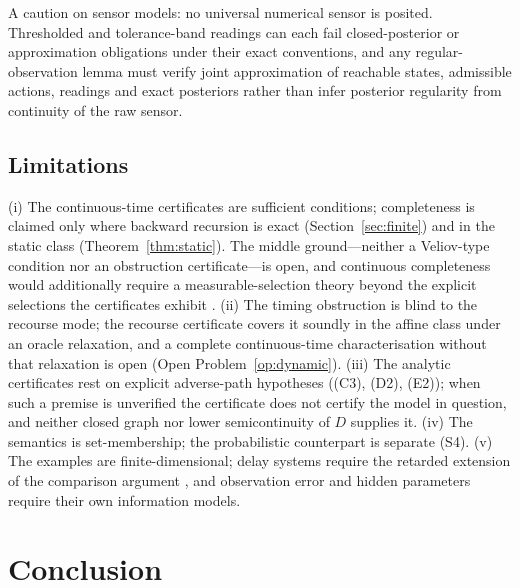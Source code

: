 \documentclass[11pt,a4paper]{article}
\theoremstyle{plain}
\theoremstyle{definition}
\theoremstyle{remark}
\newcommand{\hyp}[1]{\textup{(#1)}}
\begin{document}
A caution on sensor models: no universal numerical sensor is posited. Thresholded and tolerance-band readings can each fail closed-posterior or approximation obligations under their exact conventions, and any regular-observation lemma must verify joint approximation of reachable states, admissible actions, readings and exact posteriors rather than infer posterior regularity from continuity of the raw sensor.

\subsection{Limitations}\label{sec:limitations}

(i) The continuous-time certificates are sufficient conditions; completeness is claimed only where backward recursion is exact (Section~\ref{sec:finite}) and in the static class (Theorem~\ref{thm:static}). The middle ground---neither a Veliov-type condition nor an obstruction certificate---is open, and continuous completeness would additionally require a measurable-selection theory beyond the explicit selections the certificates exhibit \citep{bertsekas1978}. (ii) The timing obstruction is blind to the recourse mode; the recourse certificate covers it soundly in the affine class under an oracle relaxation, and a complete continuous-time characterisation without that relaxation is open (Open Problem~\ref{op:dynamic}). (iii) The analytic certificates rest on explicit adverse-path hypotheses (\hyp{C3}, \hyp{D2}, \hyp{E2}); when such a premise is unverified the certificate does not certify the model in question, and neither closed graph nor lower semicontinuity of $D$ supplies it. (iv) The semantics is set-membership; the probabilistic counterpart is separate (S4). (v) The examples are finite-dimensional; delay systems require the retarded extension of the comparison argument \citep{hale1993}, and observation error and hidden parameters require their own information models.
\section{Conclusion}\label{sec:conclusion}
\end{document}
